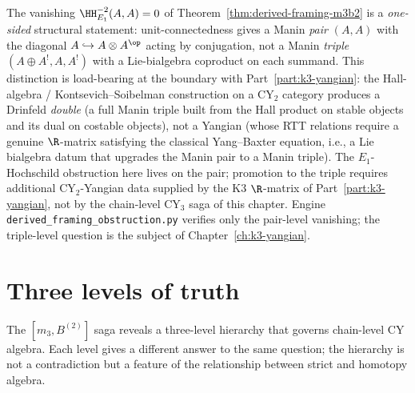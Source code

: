 \begin{remark}
\label{rem:m3b2-DNA-manin-pair}
The vanishing
$\HH^{-2}_{E_1}(A, A) = 0$ of
Theorem~\ref{thm:derived-framing-m3b2} is a \emph{one-sided}
structural statement: unit-connectedness gives a Manin \emph{pair}
$(A, A)$ with the diagonal $A \hookrightarrow A \otimes A^{\op}$
acting by conjugation, not a Manin \emph{triple}
$(A \oplus A^!, A, A^!)$ with a Lie-bialgebra coproduct
on each summand.  This distinction is load-bearing at the
boundary with Part~\ref{part:k3-yangian}: the Hall-algebra /
Kontsevich--Soibelman construction on a CY$_2$ category produces
a Drinfeld \emph{double} (a full Manin triple built from the Hall
product on stable objects and its dual on costable objects), not
a Yangian (whose RTT relations require a genuine $\R$-matrix
satisfying the classical Yang--Baxter equation, i.e., a Lie
bialgebra datum that upgrades the Manin pair to a Manin triple).
The $E_1$-Hochschild obstruction here lives on the pair; promotion
to the triple requires additional CY$_2$-Yangian data supplied by
the K3 $\R$-matrix of Part~\ref{part:k3-yangian}, not by the
chain-level CY$_3$ saga of this chapter.  Engine
\texttt{derived\_framing\_obstruction.py} verifies only the pair-level
vanishing; the triple-level question is the subject of
Chapter~\ref{ch:k3-yangian}.
\end{remark}


\section{Three levels of truth}
\label{sec:m3b2-three-levels}

The $[m_3, B^{(2)}]$ saga reveals a three-level hierarchy that
governs chain-level CY algebra.  Each level gives a different
answer to the same question; the hierarchy is not a contradiction
but a feature of the relationship between strict and homotopy
algebra.

